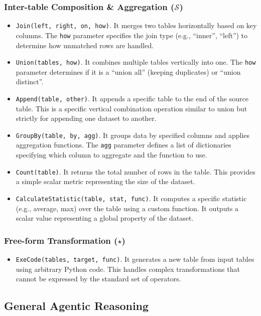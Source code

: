 \subsubsection{Inter-table Composition \& Aggregation ($\mathcal{S}$)}
\begin{itemize}[leftmargin=1em]
    \item \texttt{Join(left, right, on, how)}. It merges two tables horizontally based on key columns. The \texttt{how} parameter specifies the join type (e.g., ``inner'', ``left'') to determine how unmatched rows are handled.
    \item \texttt{Union(tables, how)}. It combines multiple tables vertically into one. The \texttt{how} parameter determines if it is a ``union all'' (keeping duplicates) or ``union distinct''.
    \item \texttt{Append(table, other)}. It appends a specific table to the end of the source table. This is a specific vertical combination operation similar to union but strictly for appending one dataset to another.
    \item \texttt{GroupBy(table, by, agg)}. It groups data by specified columns and applies aggregation functions. The \texttt{agg} parameter defines a list of dictionaries specifying which column to aggregate and the function to use.
    \item \texttt{Count(table)}. It returns the total number of rows in the table. This provides a simple scalar metric representing the size of the dataset.
    \item \texttt{CalculateStatistic(table, stat, func)}. It computes a specific statistic (e.g., average, max) over the table using a custom function. It outputs a scalar value representing a global property of the dataset.
\end{itemize}

\subsubsection{Free-form Transformation ($\star$)}
\begin{itemize}[leftmargin=1em]
    \item \texttt{ExeCode(tables, target, func)}. It generates a new table from input tables using arbitrary Python code. This handles complex transformations that cannot be expressed by the standard set of operators.
\end{itemize}

\subsection{General Agentic Reasoning}
\label{subsec:agentic_reasoning_preliminary}

